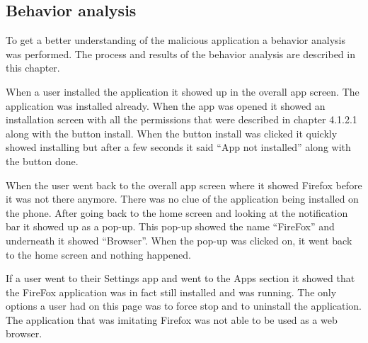 \subsection{Behavior analysis}
To get a better understanding of the malicious application a behavior analysis was performed.
The process and results of the behavior analysis are described in this chapter.

When a user installed the application it showed up in the overall app screen.
The application was installed already.
When the app was opened it showed an installation screen with all the permissions that were described in chapter 4.1.2.1 along with the button install.
When the button install was clicked it quickly showed installing but after a few seconds it said “App not installed” along with the button done.
 

When the user went back to the overall app screen where it showed Firefox before it was not there anymore.
There was no clue of the application being installed on the phone.
After going back to the home screen and looking at the notification bar it showed up as a pop-up.
This pop-up showed the name “FireFox” and underneath it showed “Browser”.
When the pop-up was clicked on, it went back to the home screen and nothing happened.

If a user went to their Settings app and went to the Apps section it showed that the FireFox application was in fact still installed and was running.
The only options a user had on this page was to force stop and to uninstall the application.
The application that was imitating Firefox was not able to be used as a web browser.